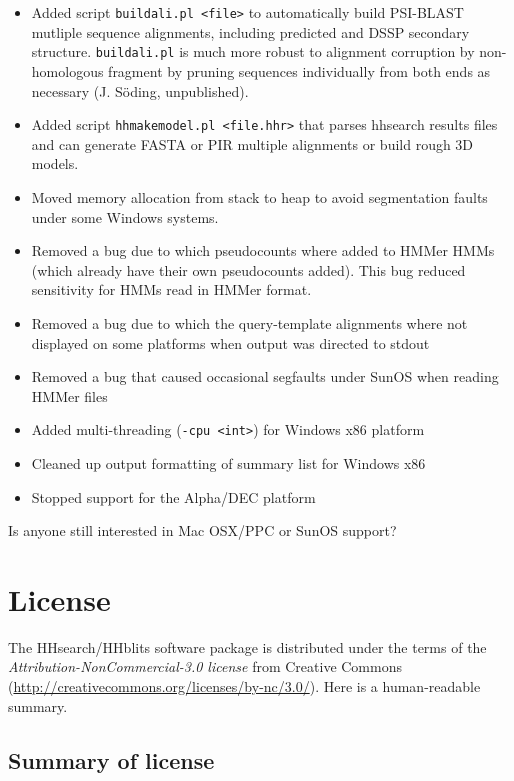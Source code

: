 \documentclass[11pt,a4paper]{article}
\begin{document}
\begin{itemize}
\item{Added script \verb`buildali.pl <file>` to automatically build PSI-BLAST mutliple 
  sequence alignments, including predicted and DSSP secondary structure. 
  \verb`buildali.pl` is much more robust to alignment corruption by non-homologous fragment by
  pruning sequences individually from both ends as necessary (J. S\"oding, unpublished).
}
\item{Added script \verb`hhmakemodel.pl <file.hhr>` that parses hhsearch results files 
  and can generate FASTA or PIR multiple alignments or build rough 3D models.
}
\item{Moved memory allocation from stack to heap to avoid segmentation faults
  under some Windows systems.
}
\item{Removed a bug due to which pseudocounts where added to HMMer HMMs (which 
  already have their own pseudocounts added). This bug reduced sensitivity 
  for HMMs read in HMMer format.
}
\item{Removed a bug due to which the query-template alignments where not displayed
  on some platforms when output was directed to stdout
}
\item{Removed a bug that caused occasional segfaults under SunOS when reading HMMer files
}
\item{Added multi-threading (\verb`-cpu <int>`) for Windows x86 platform
}
\item{Cleaned up output formatting of summary list for Windows x86
}
\item{Stopped support for the Alpha/DEC platform
}
\end{itemize}

Is anyone still interested in Mac OSX/PPC or SunOS support? 


\section{License}

The HHsearch/HHblits software package is distributed under the terms of the \emph{Attribution-NonCommercial-3.0 license} from Creative Commons (\url{http://creativecommons.org/licenses/by-nc/3.0/}). Here is a human-readable summary.

\subsection*{Summary of license}
\end{document}
